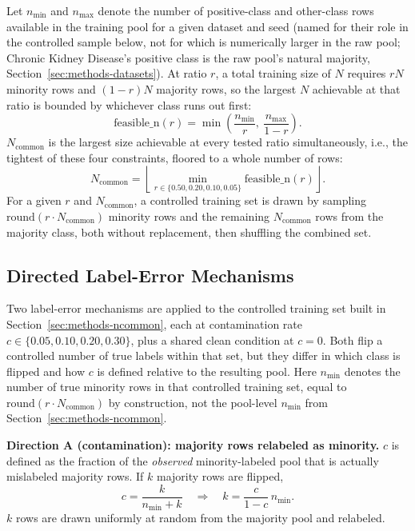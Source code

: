 Let $n_{\min}$ and $n_{\max}$ denote the number of positive-class and
other-class rows available in the training pool for a given dataset and
seed (named for their role in the controlled sample below, not for which
is numerically larger in the raw pool; Chronic Kidney Disease's positive
class is the raw pool's natural majority, Section~\ref{sec:methods-datasets}).
At ratio $r$, a
total training size of $N$ requires $rN$ minority rows and $(1-r)N$ majority
rows, so the largest $N$ achievable at that ratio is bounded by whichever
class runs out first:
\begin{equation}
\text{feasible\_n}(r) = \min\!\left(\frac{n_{\min}}{r},\ \frac{n_{\max}}{1-r}\right).
\label{eq:feasible-n}
\end{equation}
$N_{\text{common}}$ is the largest size achievable at every tested ratio
simultaneously, i.e., the tightest of these four constraints, floored to a
whole number of rows:
\begin{equation}
N_{\text{common}} = \left\lfloor \min_{r \in \{0.50,0.20,0.10,0.05\}} \text{feasible\_n}(r) \right\rfloor.
\label{eq:ncommon}
\end{equation}
For a given $r$ and $N_{\text{common}}$, a controlled training set is drawn by
sampling $\text{round}(r \cdot N_{\text{common}})$ minority rows and the
remaining $N_{\text{common}}$ rows from the majority class, both without
replacement, then shuffling the combined set.

\subsection{Directed Label-Error Mechanisms}
\label{sec:methods-corruption}

Two label-error mechanisms are applied to the controlled training set built
in Section~\ref{sec:methods-ncommon}, each at contamination rate $c \in
\{0.05, 0.10, 0.20, 0.30\}$, plus a shared clean condition at $c{=}0$. Both
flip a controlled number of true labels within that set, but they differ in
which class is flipped and how $c$ is defined relative to the resulting
pool. Here $n_{\min}$ denotes the number of true minority rows in that
controlled training set, equal to $\text{round}(r \cdot N_{\text{common}})$
by construction, not the pool-level $n_{\min}$ from
Section~\ref{sec:methods-ncommon}.

\textbf{Direction A (contamination): majority rows relabeled as minority.}
$c$ is defined as the fraction of the \emph{observed} minority-labeled pool
that is actually mislabeled majority rows. If $k$ majority rows are
flipped,
\begin{equation}
c = \frac{k}{n_{\min} + k}
\quad\Longrightarrow\quad
k = \frac{c}{1-c}\, n_{\min}.
\label{eq:directionA}
\end{equation}
$k$ rows are drawn uniformly at random from the majority pool and relabeled.


